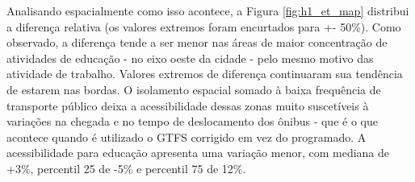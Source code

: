 \documentclass[        
    a4paper,          %
    12pt,             %
    chapter=TITLE,    %
    section=Title,    %
    subsection=Title, %
    oneside,          %
    english,          %
    spanish,          %
    brazil,           %
    fleqn             %
]{abntex2}
\begin{document}
  \begin{figure}[!h]
  \captionsetup{width=16cm}
  \centering
  \end{figure}
  
  Analisando espacialmente como isso acontece, a Figura \ref{fig:h1_et_map} distribui a diferença relativa (os valores extremos foram encurtados para +- 50\%). Como observado, a diferença tende a ser menor nas áreas de maior concentração de atividades de educação - no eixo oeste da cidade - pelo mesmo motivo das atividade de trabalho. Valores extremos de diferença continuaram sua tendência de estarem nas bordas. O isolamento espacial somado à baixa frequência de transporte público deixa a acessibilidade dessas zonas muito suscetíveis à variações na chegada e no tempo de deslocamento dos ônibus - que é o que acontece quando é utilizado o GTFS corrigido em vez do programado. A acessibilidade para educação apresenta uma variação menor, com mediana de +3\%, percentil 25 de -5\% e percentil 75 de 12\%.
  
  \begin{figure}[!h]
  \captionsetup{width=16cm}
  \centering
  \end{figure}
  
\end{document}
